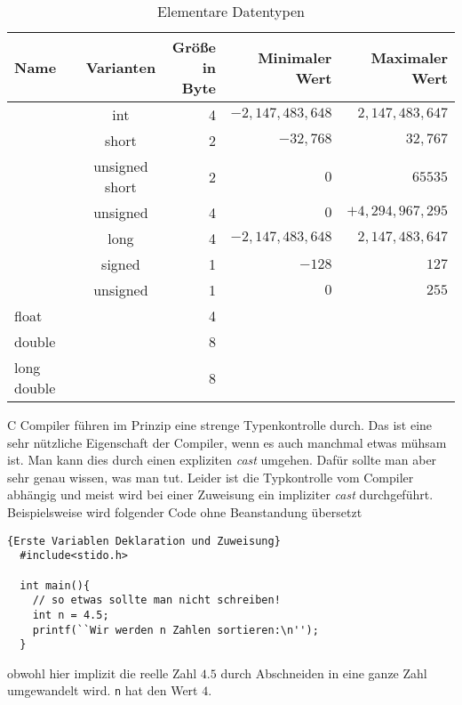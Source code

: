 \begin{table}[t]
\caption{Elementare Datentypen\label{tabelle1}}  %
\centering
\begin{tabular}{|l c c rrr|}
\hline
Name & & Varianten & Größe in Byte & Minimaler Wert & Maximaler Wert
\\[0.5ex]   
\hline %
                       & & int &4 & $-2,147,483,648$ & $2,147,483,647$ \\[-0.0ex]
                       & & short & 2 & $-32,768$ & $32,767$ \\[-0.0ex]
\raisebox{1ex}{int}  & & unsigned short& 2 & $0$ & $65535$ \\[-0.0ex]
                       & &unsigned& 4 & $0$ & $ +4,294,967,295$ \\[1ex]
                       & &long& 4 &  $-2,147,483,648$ & $2,147,483,647$ \\
\hline
                            & &signed & 1 & $-128$ & $127$ \\[-1ex]
\raisebox{1.5ex}{char} &    & unsigned &1 & $0$ & $255$  \\[1ex]
\hline
float & & & 4 &  &  \\
double& & & 8 &  &  \\
long double& & &8 &  &  \\[1ex]

\hline                          %
\end{tabular}
\label{tab:PPer}
\end{table}

C Compiler führen im Prinzip eine strenge Typenkontrolle durch.
Das ist eine sehr nützliche Eigenschaft der Compiler, wenn es auch manchmal etwas mühsam ist. 
Man kann dies durch einen expliziten \emph{cast} umgehen.
Dafür sollte man aber sehr genau wissen, was man tut.
Leider ist die Typkontrolle vom Compiler abhängig und meist wird bei einer Zuweisung ein impliziter \emph{cast} durchgeführt.
Beispielsweise wird folgender Code ohne Beanstandung übersetzt
\begin{lstlisting}{Erste Variablen Deklaration und Zuweisung}
  #include<stido.h>
  
  int main(){
    // so etwas sollte man nicht schreiben!
    int n = 4.5;
    printf(``Wir werden n Zahlen sortieren:\n'');
  }
\end{lstlisting}
obwohl hier implizit die reelle Zahl $4.5$ durch Abschneiden in eine ganze Zahl umgewandelt wird.
\texttt{n} hat den Wert $4$.

